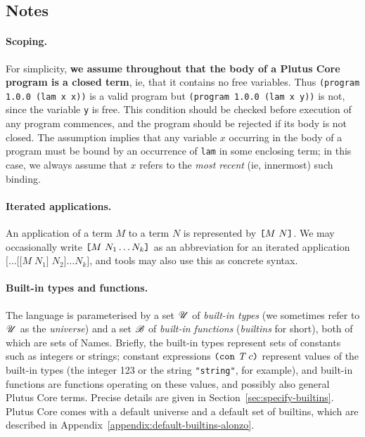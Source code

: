 \subsection{Notes}
\label{sec:grammar-notes}
\paragraph{Scoping.} For simplicity, \textbf{we assume throughout that the body of a
Plutus Core program is a closed term}, ie, that it contains no free
variables.  Thus \texttt{(program 1.0.0 (lam x x))} is a valid program but
\texttt{(program 1.0.0 (lam x y))} is not, since the variable \texttt{y} is
free. This condition should be checked before execution of any program
commences, and the program should be rejected if its body is not closed.  The
assumption implies that any variable $x$ occurring in the body of a program must
be bound by an occurrence of \texttt{lam} in some enclosing term; in this case,
we always assume that $x$ refers to the \textit{most recent} (ie, innermost)
such binding.

\paragraph{Iterated applications.}
An application of a term $M$ to a term $N$ is represented by
$\texttt{[} M ~ N \texttt{]}$.   We may occasionally write $\texttt{[} M ~ N_1
  \ldots N_k \texttt{]}$ as an abbreviation for an iterated application
$\mathtt{[}\ldots\mathtt{[[}M\;N_1\mathtt{]}\;N_2\mathtt{]}\ldots
  N_k\mathtt{]}$, and tools may also use this as concrete syntax.

\paragraph{Built-in types and functions.} The language is parameterised by a set $\mathscr{U}$ of
\textit{built-in types} (we sometimes refer to $\mathscr{U}$ as the
\textit{universe}) and a set $\mathscr{B}$ of \textit{built-in functions}
(\textit{builtins} for short), both of which are sets of Names.
Briefly, the built-in types represent sets of constants such as
integers or strings; constant expressions $\texttt{(} \texttt{con} ~ \textit{T} ~ c \texttt{)}$ represent
values of the built-in types (the integer 123 or the string
\texttt{"string"}, for example), and built-in functions are functions
operating on these values, and possibly also general Plutus Core
terms.  Precise details are given in
Section~\ref{sec:specify-builtins}.  Plutus Core comes with a default
universe and a default set of builtins, which are described in
Appendix~\ref{appendix:default-builtins-alonzo}.%

